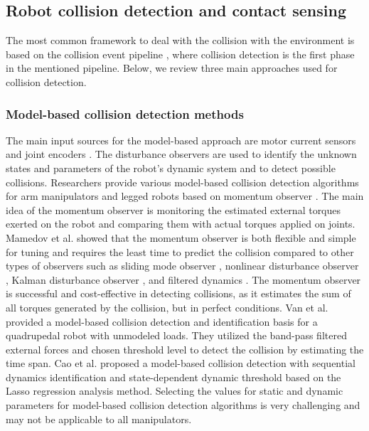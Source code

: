 \documentclass[lettersize,journal]{IEEEtran}
\begin{document}
\subsection{Robot collision detection and contact sensing}
The most common framework to deal with the collision with the environment is based on the collision event pipeline \cite{haddadin2008collision}, where collision detection is the first phase in the mentioned pipeline. Below, we review three main approaches used for collision detection.

\subsubsection{Model-based collision detection methods}

The main input sources for the model-based approach are motor current sensors and joint encoders \cite{de2005sensorless,garofalo2019sliding,haddadin2008collision,de2006collision}. The disturbance observers are used to identify the unknown states and parameters of the robot's dynamic system and to detect possible collisions. Researchers provide various model-based collision detection algorithms for arm manipulators and legged robots based on momentum observer \cite{haddadin2017robot}. The main idea of the momentum observer is monitoring the estimated external torques exerted on the robot and comparing them with actual torques applied on joints. Mamedov et al. \cite{mamedov2020practical} showed that the momentum observer is both flexible and simple for tuning and requires the least time to predict the collision compared to other types of observers such as sliding mode observer \cite{garofalo2019sliding}, nonlinear disturbance observer \cite{chen2000nonlinear}, Kalman disturbance observer \cite{hu2017contact}, and filtered dynamics \cite{van2011estimating}. The momentum observer is successful and cost-effective in detecting collisions, as it estimates the sum of all torques generated by the collision, but in perfect conditions. %
Van et al. \cite{van2022collision} provided a model-based collision detection and identification basis for a quadrupedal robot with unmodeled loads. They utilized the band-pass filtered external forces and chosen threshold level to detect the collision by estimating the time span. Cao et al. \cite{cao2019model} proposed a model-based collision detection with sequential dynamics identification and state-dependent dynamic threshold based on the Lasso regression analysis method. Selecting the values for static and dynamic parameters for model-based collision detection algorithms is very challenging and may not be applicable to all manipulators.
\end{document}
